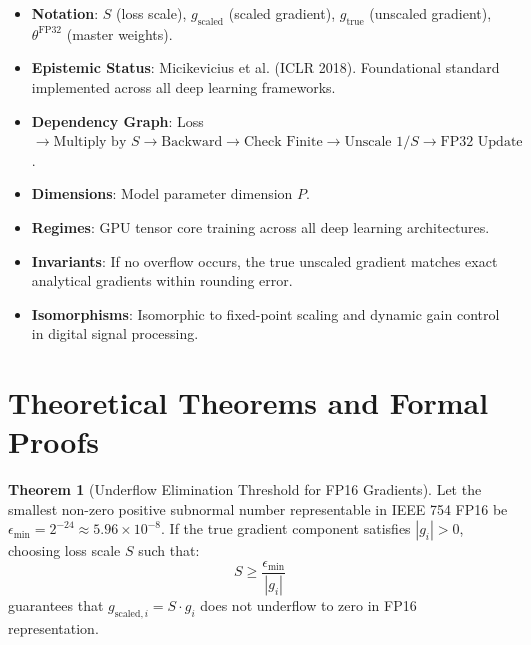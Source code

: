 \documentclass[11pt,a4paper]{article}
\theoremstyle{definition}
\newtheorem{theorem}{\textbf{Theorem}}[section]
\begin{document}
\begin{itemize}
    \item \textbf{Notation}: $S$ (loss scale), $g_{\text{scaled}}$ (scaled gradient), $g_{\text{true}}$ (unscaled gradient), $\theta^{\text{FP32}}$ (master weights).
    \item \textbf{Epistemic Status}: Micikevicius et al. (ICLR 2018). Foundational standard implemented across all deep learning frameworks.
    \item \textbf{Dependency Graph}: Loss $\to \text{Multiply by } S \to \text{Backward} \to \text{Check Finite} \to \text{Unscale } 1/S \to \text{FP32 Update}$.
    \item \textbf{Dimensions}: Model parameter dimension $P$.
    \item \textbf{Regimes}: GPU tensor core training across all deep learning architectures.
    \item \textbf{Invariants}: If no overflow occurs, the true unscaled gradient matches exact analytical gradients within rounding error.
    \item \textbf{Isomorphisms}: Isomorphic to fixed-point scaling and dynamic gain control in digital signal processing.
\end{itemize}

\section{Theoretical Theorems and Formal Proofs}

\begin{theorem}[Underflow Elimination Threshold for FP16 Gradients]
Let the smallest non-zero positive subnormal number representable in IEEE 754 FP16 be $\epsilon_{\min} = 2^{-24} \approx 5.96 \times 10^{-8}$. If the true gradient component satisfies $|g_i| > 0$, choosing loss scale $S$ such that:
{\boldmath
\begin{equation}
S \ge \frac{\epsilon_{\min}}{|g_i|}
\end{equation}
}
guarantees that $g_{\text{scaled}, i} = S \cdot g_i$ does not underflow to zero in FP16 representation.
\end{theorem}
\end{document}
